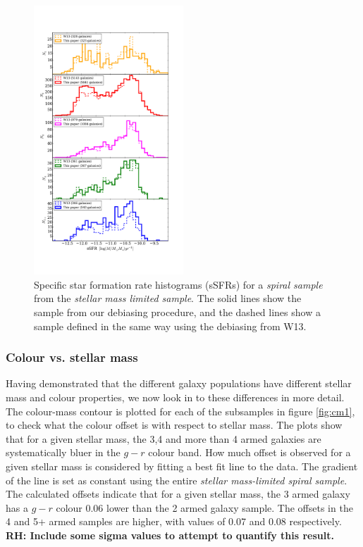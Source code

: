 \documentclass[useAMS,usenatbib]{mn2e}
\newcommand{\rh}[1]{{\bf \textcolor{RoyalPurple}{RH: #1}}}
\begin{document}
\begin{figure}
		\centering

        \includegraphics[width=0.5\textwidth]{Histograms/ssfr_histogram.pdf}

        \caption{Specific star formation rate histograms (sSFRs) for a \textit{spiral sample} from the \textit{stellar mass limited sample}. The solid lines show the sample from our debiasing procedure, and the dashed lines show a sample defined in the same way using the debiasing from W13.}

        \label{fig:ssfr_histogram}

\end{figure}

\subsubsection{Colour vs. stellar mass}
\label{sec:colour_mass}

Having demonstrated that the different galaxy populations have different stellar mass and colour properties, we now look in to these differences in more detail. The colour-mass contour is plotted for each of the subsamples in figure \ref{fig:cm1}, to check what the colour offset is with respect to stellar mass. The plots show that for a given stellar mass, the 3,4 and more than 4 armed galaxies are systematically bluer in the $g-r$ colour band. How much offset is observed for a given stellar mass is considered by fitting a best fit line to the data. The gradient of the line is set as constant using the entire \textit{stellar mass-limited spiral sample}. The calculated offsets indicate that for a given stellar mass, the 3 armed galaxy has a $g-r$ colour 0.06 lower than the 2 armed galaxy sample. The offsets in the 4 and 5+ armed samples are higher, with values of 0.07 and 0.08 respectively. \rh{Include some sigma values to attempt to quantify this result.}
\end{document}
